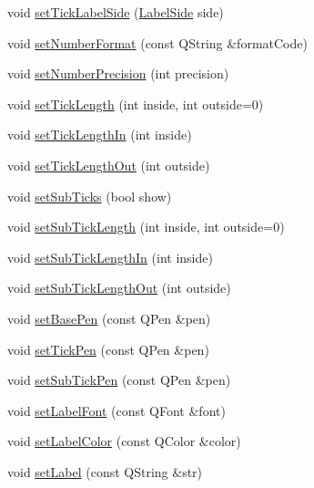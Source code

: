 \begin{DoxyCompactItemize}
\item 
void \hyperlink{class_q_c_p_axis_a13ec644fc6e22715744c92c6dfa4f0fa}{set\+Tick\+Label\+Side} (\hyperlink{class_q_c_p_axis_a24b13374b9b8f75f47eed2ea78c37db9}{Label\+Side} side)
\item 
void \hyperlink{class_q_c_p_axis_ae585a54dc2aac662e90a2ca82f002590}{set\+Number\+Format} (const Q\+String \&format\+Code)
\item 
void \hyperlink{class_q_c_p_axis_a21dc8023ad7500382ad9574b48137e63}{set\+Number\+Precision} (int precision)
\item 
void \hyperlink{class_q_c_p_axis_a62ec40bebe3540e9c1479a8fd2be3b0d}{set\+Tick\+Length} (int inside, int outside=0)
\item 
void \hyperlink{class_q_c_p_axis_afae1a37a99611366275a51204d991739}{set\+Tick\+Length\+In} (int inside)
\item 
void \hyperlink{class_q_c_p_axis_a3b8a0debd1ffedd2c22d0592dfbb4e62}{set\+Tick\+Length\+Out} (int outside)
\item 
void \hyperlink{class_q_c_p_axis_afa0ce8d4d0015ed23dcde01f8bc30106}{set\+Sub\+Ticks} (bool show)
\item 
void \hyperlink{class_q_c_p_axis_ab702d6fd42fc620607435339a1c2a2e1}{set\+Sub\+Tick\+Length} (int inside, int outside=0)
\item 
void \hyperlink{class_q_c_p_axis_ac46fa2a993a9f5789540977610acf1de}{set\+Sub\+Tick\+Length\+In} (int inside)
\item 
void \hyperlink{class_q_c_p_axis_a4c6dfc3963492ed72a77724012df5f23}{set\+Sub\+Tick\+Length\+Out} (int outside)
\item 
void \hyperlink{class_q_c_p_axis_a778d45fb71b3c7ab3bb7079e18b058e4}{set\+Base\+Pen} (const Q\+Pen \&pen)
\item 
void \hyperlink{class_q_c_p_axis_ad80923bcc1c5da4c4db602c5325e797e}{set\+Tick\+Pen} (const Q\+Pen \&pen)
\item 
void \hyperlink{class_q_c_p_axis_aede4028ae7516bd51a60618a8233f9cf}{set\+Sub\+Tick\+Pen} (const Q\+Pen \&pen)
\item 
void \hyperlink{class_q_c_p_axis_a71ac1a47f7547e490a8c4311d1433cf3}{set\+Label\+Font} (const Q\+Font \&font)
\item 
void \hyperlink{class_q_c_p_axis_a6c906fe56d75f0122335b9f79b999608}{set\+Label\+Color} (const Q\+Color \&color)
\item 
void \hyperlink{class_q_c_p_axis_a33bcc382c111c9f31bb0687352a2dea4}{set\+Label} (const Q\+String \&str)
\item 

\end{DoxyCompactItemize}
